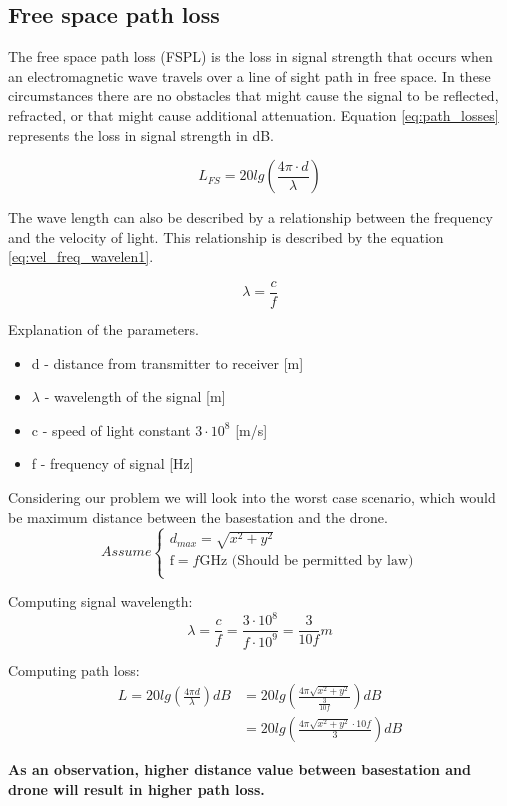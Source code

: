 
\subsection*{Free space path loss}\label{subsection:path_loss}

The free space path loss (FSPL) is the loss in signal strength that occurs when an electromagnetic wave travels over a line of sight path in free space. In these circumstances there are no obstacles that might cause the signal to be reflected, refracted, or that might cause additional attenuation. Equation \ref{eq:path_losses} represents the loss in signal strength in dB.

\begin{equation}\label{eq:path_losses}
L_{FS} = 20lg\left (\frac{4\pi \cdot d}{\lambda} \right)
\end{equation}

The wave length can also be described by a relationship between the frequency and the velocity of light. This relationship is described by the equation \ref{eq:vel_freq_wavelen1}.

\begin{equation}\label{eq:vel_freq_wavelen1}
\lambda = \frac{c}{f}
\end{equation}


Explanation of the parameters.
\begin{itemize}
\item d - distance from transmitter to receiver [m]
\item $\lambda$ - wavelength of the signal [m]
\item c - speed of light constant $3\cdot 10^8$ [m/s] 
\item f - frequency of signal [Hz]
\end{itemize}

Considering our problem we will look into the worst case scenario, which would be maximum distance between the basestation and the drone. 
\begin{equation*}
Assume \begin{cases}
d_{max} = \sqrt{x^2+y^2}\\
\text{f} = f\text{GHz (Should be permitted by law})\\
\end{cases}
\end{equation*}

Computing signal wavelength:
\begin{equation}\label{eq:vel_freq_wavelen2}
	\lambda = \frac{c}{f} 
	        = \frac{3\cdot 10^{8}}{f\cdot 10^{9}}
	        = \frac{3}{10f}m
\end{equation}

Computing path loss:
\begin{align*}\label{eq:path_loses_calc}
	L = 20lg\left (\frac{4\pi d}{\lambda} \right) dB &= 20lg\left (\frac{4\pi \sqrt{x^2+y^2}}{\frac{3}{10f}} \right) dB \\ 
	&= 20lg\left (\frac{4\pi \sqrt{x^2+y^2}\cdot 10f}{ 3} \right) dB
\end{align*}

\noindent \textbf{As an observation, higher distance value between basestation and drone will result in higher path loss.}